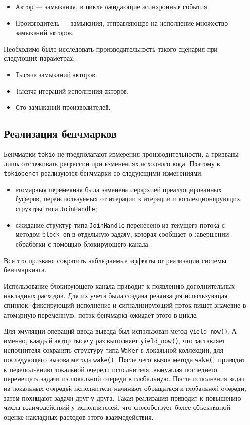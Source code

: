 \begin{itemize}
    \item Актор --- замыкания, в цикле ожидающие асинхронные события.
    \item Производитель --- замыкания, отправляющее на исполнение множество замыканий акторов.
\end{itemize}

Необходимо было исследовать производительность такого сценария при следующих параметрах:

\begin{itemize}
    \item Тысяча замыканий акторов.
    \item Тысяча итераций исполнения акторов.
    \item Сто замыканий производителей.
\end{itemize}

\subsection{Реализация бенчмарков}

Бенчмарки \verb|tokio| не предполагают измерения производительности, а призваны лишь отслеживать регрессии при изменениях исходного кода. Поэтому в \verb|tokiobench| реализуются бенчмарки со следующими изменениями:

\begin{itemize}
    \item атомарныя переменная была заменена иерархией преаллоцированных буферов, переиспользуемых от итерации к итерации и коллекционирующих структры типа \verb|JoinHandle|;
    \item ожидание структур типа \verb|JoinHandle| перенесено из текущего потока с методом \verb|block_on| в отдельную задачу, которая сообщает о завершении обработки с помощью блокирующего канала.
\end{itemize}

Все это призвано сократить наблюдаемые эффекты от реализации системы бенчмаркинга.

Использование блокирующего канала приводит к появлению дополнительных накладных расходов. Для их учета была создана реализация использующая спинлок: фиксирующий исполнение и сигнализирующий поток пишет значение в атомарную переменную, поток бенчмарка ожидает этого в цикле.

Для эмуляции операций ввода вывода был использован метод \verb|yield_now()|. А именно, каждый актор тысячу раз выполняет \verb|yield_now()|, что заставляет исполнителя сохранять структуру типа \verb|Waker| в локальной коллекции, для последующего вызова метода \verb|wake()|. После чего вызов метода \verb|wake()| приводит к переполнению локальной очереди исполнителя, вынуждая последнего перемещать задачи из локальной очереди в глобальную. После исполнения задач из локальных очередей исполнители начинают обращаться к глобальной очереди, затем похищают задачи друг у друга. Такая реализация приводит к повышению числа взаимодействий у исполнителей, что способствует более объективной оценке накладных расходов этого взаимодействия.
